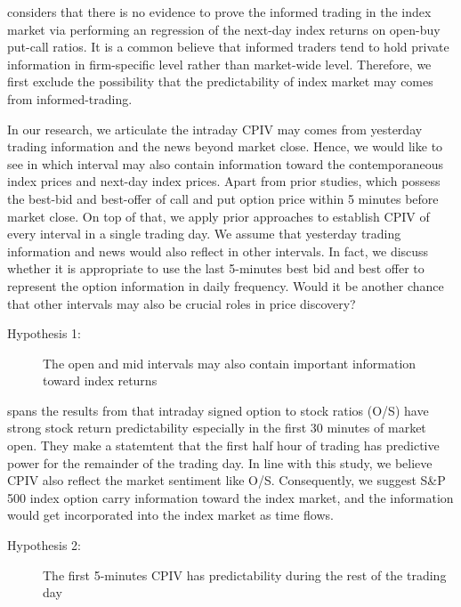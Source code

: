 
\textcite{pan2006information} considers that there is no evidence to prove the informed trading in the index market via performing an regression of the next-day index returns on open-buy put-call ratios. It is a common believe that informed traders tend to hold private information in firm-specific level rather than market-wide level. Therefore, we first exclude the possibility that the predictability of index market may comes from informed-trading. 

In our research, we articulate the intraday CPIV may comes from yesterday trading information and the news beyond market close. Hence, we would like to see in which interval may also contain information toward the contemporaneous index prices and next-day index prices. Apart from prior studies, which possess the best-bid and best-offer of call and put option price within 5 minutes before market close. On top of that, we apply prior approaches to establish CPIV of every interval in a single trading day. We assume that yesterday trading information and news would also reflect in other intervals. In fact, we discuss whether it is appropriate to use the last 5-minutes best bid and best offer to represent the option information in daily frequency. Would it be another chance that other intervals may also be crucial roles in price discovery?  

\begin{description}
\item[Hypothesis 1:] The open and mid intervals may also contain important information toward index returns
\end{description}


\textcite{bergsma2018intraday} spans the results from \textcite{easley1998option} that intraday signed option to stock ratios (O/S) have strong stock return predictability especially in the first 30 minutes of market open. They make a statemtent that the first half hour of trading has predictive power for the remainder of the trading day. In line with this study, we believe CPIV also reflect the market sentiment like O/S. Consequently, we suggest S\&P 500 index option carry information toward the index market, and the information would get incorporated into the index market as time flows. 

\begin{description}
\item[Hypothesis 2:] The first 5-minutes CPIV has predictability during the rest of the trading day
\end{description}




